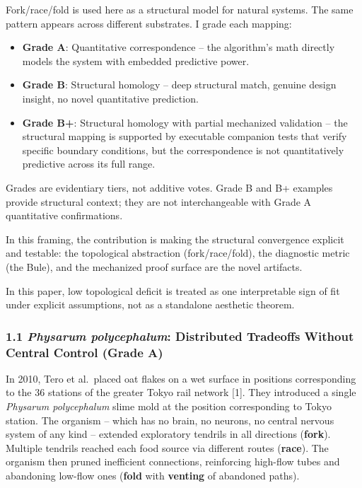 \documentclass[
  11pt,
]{article}
\begin{document}
Fork/race/fold is used here as a structural model for natural systems.
The same pattern appears across different substrates. I grade each
mapping:

\begin{itemize}
\item
  \textbf{Grade A}: Quantitative correspondence -- the algorithm's math
  directly models the system with embedded predictive power.
\item
  \textbf{Grade B}: Structural homology -- deep structural match,
  genuine design insight, no novel quantitative prediction.
\item
  \textbf{Grade B+}: Structural homology with partial mechanized
  validation -- the structural mapping is supported by executable
  companion tests that verify specific boundary conditions, but the
  correspondence is not quantitatively predictive across its full range.
\end{itemize}

Grades are evidentiary tiers, not additive votes. Grade B and B+
examples provide structural context; they are not interchangeable with
Grade A quantitative confirmations.

In this framing, the contribution is making the structural convergence
explicit and testable: the topological abstraction (fork/race/fold), the
diagnostic metric (the Bule), and the mechanized proof surface are the
novel artifacts.

In this paper, low topological deficit is treated as one interpretable
sign of fit under explicit assumptions, not as a standalone aesthetic
theorem.

\subsubsection{\texorpdfstring{1.1 \emph{Physarum polycephalum}:
Distributed Tradeoffs Without Central Control (Grade
A)}{1.1 Physarum polycephalum: Distributed Tradeoffs Without Central Control (Grade A)}}\label{physarum-polycephalum-distributed-tradeoffs-without-central-control-grade-a}

In 2010, Tero et al.~placed oat flakes on a wet surface in positions
corresponding to the 36 stations of the greater Tokyo rail network
{[}1{]}. They introduced a single \emph{Physarum polycephalum} slime
mold at the position corresponding to Tokyo station. The organism --
which has no brain, no neurons, no central nervous system of any kind --
extended exploratory tendrils in all directions (\textbf{fork}).
Multiple tendrils reached each food source via different routes
(\textbf{race}). The organism then pruned inefficient connections,
reinforcing high-flow tubes and abandoning low-flow ones (\textbf{fold}
with \textbf{venting} of abandoned paths).
\end{document}
